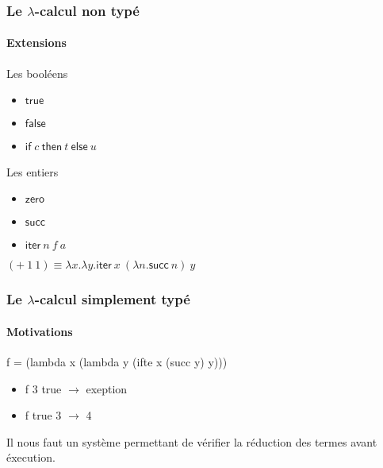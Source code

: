 \documentclass{beamer}
\newcommand{\Lam}[2]{\ensuremath{\lambda #1. #2}}
\newcommand{\ifte}[4][]{\ensuremath{\mathsf{if}_{#1}\: #2\: \mathsf{then}\: #3\: \mathsf{else}\: #4}}
\newcommand{\true}{\ensuremath{\mathsf{true}}}
\newcommand{\false}{\ensuremath{\mathsf{false}}}
\newcommand{\zero}{\ensuremath{\mathsf{zero}}}
\newcommand{\succs}{\ensuremath{\mathsf{succ}}}
\newcommand{\iter}{\ensuremath{\mathsf{iter}}}
\begin{document}
\begin{frame}
\frametitle{Le $\lambda$-calcul non typé}
\framesubtitle{Extensions}

\begin{block}{Les booléens}
  \begin{itemize}
  \item $\true$ 
  \item $\false$
  \item $\ifte{c}{t}{u}$
  \end{itemize}
\end{block}

\begin{block}{Les entiers}
  \begin{itemize}
  \item $\zero$ 
  \item $\succs$ 
  \item $\iter\:n\:f\:a$ 
  \end{itemize}
  $(+\:1\:1) \equiv \Lam{x}{\Lam{y}{\iter\: x\:(\Lam{n}{\succs\:n})\:y  }}$
\end{block}  
\end{frame}
\begin{frame}
\frametitle{Le $\lambda$-calcul simplement typé}
\framesubtitle{Motivations} 

\begin{block}{}
  f = (lambda x (lambda y (ifte x (succ y) y)))
  \begin{itemize}
  \item f 3 true $\rightarrow$ exeption
  \item f true 3 $\rightarrow$ 4  
  \end{itemize}
\end{block}

\begin{block}{}
  Il nous faut un système permettant de vérifier 
  la réduction des termes avant éxecution.
\end{block}



\end{frame}
\end{document}
